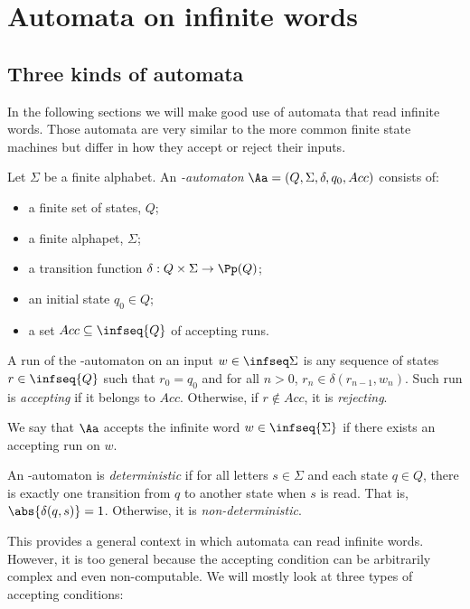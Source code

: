 \clearpage

\section{Automata on infinite words}
\subsection{Three kinds of automata}

In the following sections
we will make good use of automata that read infinite words.
Those automata are very similar to the more common
finite state machines but differ in how they accept
or reject their inputs.

\begin{definition}
    Let $\Sigma$ be a finite alphabet.
    An \emph{\w-automaton} $\Aa = (Q, \Sigma, \delta, q_0, Acc)$
    consists of:
    \begin{itemize}
        \item a finite set of states, $Q$;
        \item a finite alphapet, $\Sigma$;
        \item a transition function $\delta : Q \times \Sigma \to \Pp(Q)$;
        \item an initial state $q_0 \in Q$;
        \item a set $Acc \subseteq \infseq{Q}$ of accepting runs.
    \end{itemize}

    A run of the \w-automaton on an input $w \in \infseq\Sigma$
    is any sequence of states $r \in \infseq{Q}$ such that
    $r_0 = q_0$ and for all $n > 0$, $r_n \in \delta(r_{n-1}, w_n)$.
    Such run is \emph{accepting} if it belongs to $Acc$.
    Otherwise, if $r \notin Acc$, it is \emph{rejecting}.

    We say that $\Aa$ accepts the infinite word $w \in \infseq{\Sigma}$
    if there exists an accepting run on $w$.

    An \w-automaton is \emph{deterministic} if for all
    letters $s \in \Sigma$ and each state $q \in Q$,
    there is exactly one transition from $q$ to another state
    when $s$ is read. That is, $\abs{\delta(q, s)} = 1$.
    Otherwise, it is \emph{non-deterministic}.

\end{definition}


This provides a general context in which automata can read infinite
words. However, it is too general because the accepting condition
can be arbitrarily complex and even non-computable.
We will mostly look at three types of accepting conditions:

